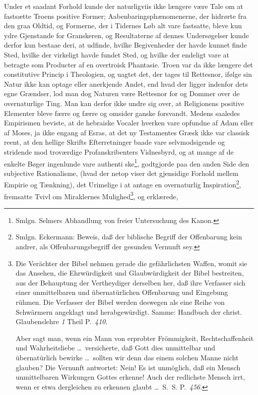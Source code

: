 \documentclass[12pt]{book}
\newcommand{\opage}[1]{\marginnote{\footnotesize\textit{[#1]}}}
\begin{document}
\opage{91} %
Under et saadant Forhold kunde der naturligviis ikke længere være Tale om at
fastsætte Troens positive Former; Aabenbaringsphænomenerne, der hidrørte fra
den graa Oldtid, og Formerne, der i Tidernes Løb alt vare fastsatte, bleve kun
ydre Gjenstande for Granskeren, og Resultaterne af dennes Undersøgelser kunde
derfor kun bestaae deri, at udfinde, hvilke Begivenheder der havde kunnet finde
Sted, hvilke der virkeligt havde fundet Sted, og hvilke der endeligt vare at
betragte som Producter af en overtroisk Phantasie. Troen var da ikke længere
det constitutive Princip i Theologien, og uagtet det, der tages til Rettesnor,
ifølge sin Natur ikke kan optage eller anerkjende Andet, end hvad der ligger
indenfor dets egne Grændser, lod man dog Naturen være Rettesnor for og Dommer
over de overnaturlige Ting. Man kan derfor ikke undre sig over, at Religionens
positive Elementer bleve færre og færre og omsider ganske forsvandt. Medens
saaledes Empirismen beviste, at de hebraiske Vocaler hverken vare opfundne af
Adam eller af Moses, ja ikke engang af Esras, at det ny Testamentes Græsk ikke
var classisk reent, at den hellige Skrifts Efterretninger baade vare
selvmodsigende og stridende mod troværdige Profanskribenters Vidnesbyrd, og at
mange af de enkelte Bøger ingenlunde vare authenti\-%
\opage{92}%
\setcounter{footnote}{0}%
ske\footnote{Smlgn. Selmers Abhandlung von freier Untersuchung des Kanon.},
godtgjorde paa den anden Side den subjective Rationalisme, (hvad der netop
viser det gjensidige Forhold mellem Empirie og Tænkning), det Urimelige i at
antage en overnaturlig Inspiration\footnote{Smlgn. Eckermann: Beweis, daß der
biblische Begriff der Offenbarung kein andrer, als Offenbarungsbegriff der
gesunden Vernunft sey.}, fremsatte Tvivl om Miraklernes
Mulighed\footnote{Die Verächter der Bibel nehmen gerade die gefährlichsten
Waffen, womit sie das Ansehen, die Ehrwürdigkeit und Glaubwürdigkeit der Bibel
bestreiten, aus der Behauptung der Vertheydiger derselben her, daß ihre
Verfasser sich einer unmittelbaren und übernatürlichen Offenbarung und
Eingebung rühmen. Die Verfasser der Bibel werden deswegen als eine Reihe von
Schwärmern angeklagt und herabgewürdigt. Samme: Handbuch der christ.
Glaubenslehre \textit{1} Theil P.~\textit{410}.\par
Aber sagt man, wenn ein Mann von erprobter Frömmigkeit, Rechtschaffenheit und
Wahrheitsliebe \ldots\ versicherte, daß Gott dies unmittelbar und übernatürlich
bewirke \ldots\ sollten wir denn das einem solchen Manne nicht glauben? Die
Vernunft antwortet: Nein! Es ist unmöglich, daß ein Mensch unmittelbaren
Wirkungen Gottes erkenne! Auch der redlichste Mensch irrt, wenn er etwa
dergleichen zu erkennen glaubt \ldots\ S.~S. P.~\textit{456}.}, og erklærede,
\end{document}
